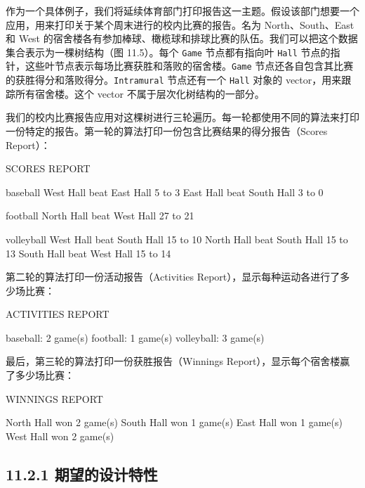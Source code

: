 作为一个具体例子，我们将延续体育部门打印报告这一主题。假设该部门想要一个应用，用来打印关于某个周末进行的校内比赛的报告。名为 North、South、East 和 West 的宿舍楼各有参加棒球、橄榄球和排球比赛的队伍。我们可以把这个数据集合表示为一棵树结构（图 11.5）。每个 \texttt{Game} 节点都有指向叶 \texttt{Hall} 节点的指针，这些叶节点表示每场比赛获胜和落败的宿舍楼。\texttt{Game} 节点还各自包含其比赛的获胜得分和落败得分。\texttt{Intramural} 节点还有一个 \texttt{Hall} 对象的 vector，用来跟踪所有宿舍楼。这个 vector 不属于层次化树结构的一部分。


我们的校内比赛报告应用对这棵树进行三轮遍历。每一轮都使用不同的算法来打印一份特定的报告。第一轮的算法打印一份包含比赛结果的得分报告（Scores Report）：

\begin{codebox}
SCORES REPORT

  baseball
     West Hall beat  East Hall  5 to  3
     East Hall beat South Hall  3 to  0

  football
    North Hall beat  West Hall 27 to 21

  volleyball
     West Hall beat South Hall 15 to 10
    North Hall beat South Hall 15 to 13
    South Hall beat  West Hall 15 to 14
\end{codebox}

第二轮的算法打印一份活动报告（Activities Report），显示每种运动各进行了多少场比赛：

\begin{codebox}
ACTIVITIES REPORT

    baseball: 2 game(s)
    football: 1 game(s)
  volleyball: 3 game(s)
\end{codebox}

最后，第三轮的算法打印一份获胜报告（Winnings Report），显示每个宿舍楼赢了多少场比赛：

\begin{codebox}
WINNINGS REPORT

  North Hall won 2 game(s)
  South Hall won 1 game(s)
   East Hall won 1 game(s)
   West Hall won 2 game(s)
\end{codebox}

\subsection{11.2.1 期望的设计特性}

